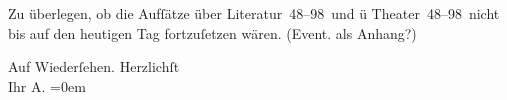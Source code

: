 \pstart
           Zu überlegen, ob die Aufſätze über Literatur 48–98 und ü Theater 48–98 nicht bis auf
               den heutigen Tag fortzuſetzen wären. (Event. als Anhang?)\pend
           
\pstart
           Auf Wiederſehen. Herzlichſt {\\[\baselineskip]}Ihr \spacefill\mbox{A.}\pend
           \leftskip=0em{}\endnumbering{}  \newcommand{\dateiname}{L02972}\newcommand{\titel}{Arthur Schnitzler an Felix Salten, 25. 3. [1902]}\newcommand{\editorInnen}{Martin Anton Müller und Laura Untner}
